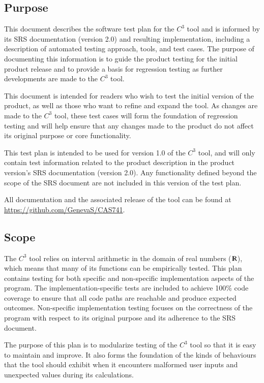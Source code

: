 \documentclass[12pt, titlepage]{article}
\newcommand{\prognameAbbrv}{$C^{3}$}
\newcommand{\srsVersion}{2.0}
\begin{document}
\subsection{Purpose}
This document describes the software test plan for the \prognameAbbrv{} tool 
and is informed by its SRS documentation (version \srsVersion{}) and resulting 
implementation, including a description of automated testing approach, tools, 
and test cases. The purpose of documenting this information is to guide the 
product testing for the initial product release and to provide a basis for 
regression testing as further developments are made to the \prognameAbbrv{} 
tool.

This document is intended for readers who wish to test the initial version of 
the product, as well as those who want to refine and expand the tool. As 
changes are made to the \prognameAbbrv{} tool, these test cases will form the 
foundation of regression testing and will help ensure that any changes made to 
the product do not affect its original purpose or core functionality.

This test plan is intended to be used for version 1.0 of the \prognameAbbrv{} 
tool, and will only contain test information related to the product description 
in the product version's SRS documentation (version \srsVersion{}). Any 
functionality defined beyond the scope of the SRS document are not included in 
this version of the test plan.

All documentation and the associated release of the tool can be found at 
\href{https://github.com/GenevaS/CAS741}{https://github.com/GenevaS/CAS741}.

\subsection{Scope}
The \prognameAbbrv{} tool relies on interval arithmetic in the domain of real 
numbers ($\varmathbb{R}$), which means that many of its functions can be 
empirically tested. This plan contains testing for both specific and 
non-specific implementation aspects of the program. The implementation-specific 
tests are included to achieve 100\% code coverage to ensure that all code paths 
are reachable and produce expected outcomes. Non-specific implementation 
testing focuses on the correctness of the program with respect to its original 
purpose and its adherence to the SRS document.

The purpose of this plan is to modularize testing of the \prognameAbbrv{} 
tool so that it is easy to maintain and improve. It also forms the 
foundation of the kinds of behaviours that the tool should exhibit when it 
encounters malformed user inputs and unexpected values during its calculations.
\end{document}

